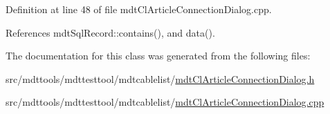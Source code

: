 Definition at line 48 of file mdt\-Cl\-Article\-Connection\-Dialog.\-cpp.



References mdt\-Sql\-Record\-::contains(), and data().



The documentation for this class was generated from the following files\-:\begin{DoxyCompactItemize}
\item 
src/mdttools/mdttesttool/mdtcablelist/\hyperlink{mdt_cl_article_connection_dialog_8h}{mdt\-Cl\-Article\-Connection\-Dialog.\-h}\item 
src/mdttools/mdttesttool/mdtcablelist/\hyperlink{mdt_cl_article_connection_dialog_8cpp}{mdt\-Cl\-Article\-Connection\-Dialog.\-cpp}\end{DoxyCompactItemize}
